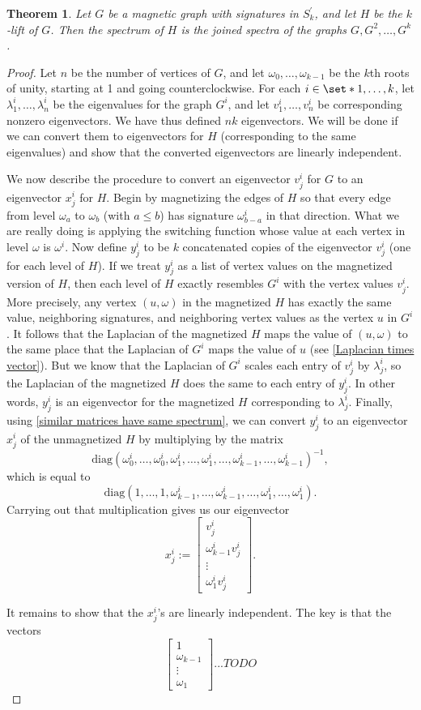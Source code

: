 \documentclass[12pt]{article}
\newtheorem{thm}{Theorem}
\theoremstyle{definition}
\begin{document}
\begin{thm}
Let $G$ be a magnetic graph with signatures in $S^\prime_k$, and let $H$ be the $k$-lift of $G$. Then the spectrum of $H$ is the joined spectra of the graphs $G, G^2, \dots, G^k$. 
\end{thm}
\begin{proof}
Let $n$ be the number of vertices of $G$, and let $\omega_0, \dots, \omega_{k-1}$ be the $k$th roots of unity, starting at 1 and going counterclockwise. For each $i \in \set*{1, \dots, k}$, let $\lambda^i_1, \dots, \lambda^i_n$ be the eigenvalues for the graph $G^i$, and let $v^i_1, \dots, v^i_n$ be corresponding nonzero eigenvectors. We have thus defined $nk$ eigenvectors. We will be done if we can convert them to eigenvectors for $H$ (corresponding to the same eigenvalues) and show that the converted eigenvectors are linearly independent.

We now describe the procedure to convert an eigenvector $v^i_{j}$ for $G$ to an eigenvector $x^i_{j}$ for $H$. Begin by magnetizing the edges of $H$ so that every edge from level $\omega_a$ to $\omega_b$ (with $a \leq b$) has signature $\omega_{b-a}^i$ in that direction. What we are really doing is applying the switching function whose value at each vertex in level $\omega$ is $\omega^i$. Now define $y^i_j$ to be $k$ concatenated copies of the eigenvector $v^i_j$ (one for each level of $H$). If we treat $y^i_j$ as a list of vertex values on the magnetized version of $H$, then each level of $H$ exactly resembles $G^i$ with the vertex values $v^i_j$. More precisely, any vertex $(u, \omega)$ in the magnetized $H$ has exactly the same value, neighboring signatures, and neighboring vertex values as the vertex $u$ in $G^i$. It follows that the Laplacian of the magnetized $H$ maps the value of $(u, \omega)$ to the same place that the Laplacian of $G^i$ maps the value of $u$ (see \cref{Laplacian times vector}). But we know that the Laplacian of $G^i$ scales each entry of $v^i_j$ by $\lambda^i_j$, so the Laplacian of the magnetized $H$ does the same to each entry of $y^i_j$. In other words, $y^i_j$ is an eigenvector for the magnetized $H$ corresponding to $\lambda^i_j$. Finally, using \cref{similar matrices have same spectrum}, we can convert $y^i_j$ to an eigenvector $x^i_j$ of the unmagnetized $H$ by multiplying by the matrix
$$
\text{diag}(\omega_0^i, \dots, \omega_0^i, \omega_1^i, \dots, \omega_1^i, \dots, \omega_{k-1}^i, \dots, \omega_{k-1}^i)^{-1},
$$
which is equal to
$$
\text{diag}(1, \dots, 1, \omega_{k-1}^i, \dots, \omega_{k-1}^i, \dots, \omega_{1}^i, \dots, \omega_{1}^i).
$$
Carrying out that multiplication gives us our eigenvector 
$$
x_j^i := \begin{bmatrix}
           v_j^i \\
           \omega_{k-1}^i v_j^i \\
           \vdots \\
           \omega_{1}^i v_j^i
         \end{bmatrix}.
$$

It remains to show that the $x_j^i$'s are linearly independent. The key is that the vectors 
$$
\begin{bmatrix}
           1 \\
           \omega_{k-1} \\
           \vdots \\
           \omega_{1}
         \end{bmatrix}... TODO
$$
\end{proof}
\end{document}
